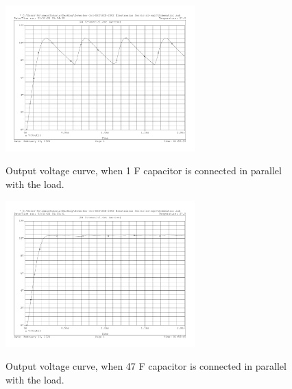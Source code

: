 \documentclass{article}
\begin{document}
	\begin{figure}[!htb]
	\begin{center}
		\includegraphics[width=0.65\textwidth]{Vout1-for-bride-fullwave-with-1ufd-capacitor.pdf} %
		\caption{} Output voltage curve, when 1 \textmu F capacitor is connected in parallel with the load.
	\end{center}
	\end{figure}



	\begin{figure}[!htb]
	\begin{center}
		\includegraphics[width=0.65\textwidth]{Vout1-for-bride-fullwave-with-47ufd-capacitor.pdf} %
		\caption{} Output voltage curve, when 47 \textmu F capacitor is connected in parallel with the load.
	\end{center}
	\end{figure}
	
\end{document}
